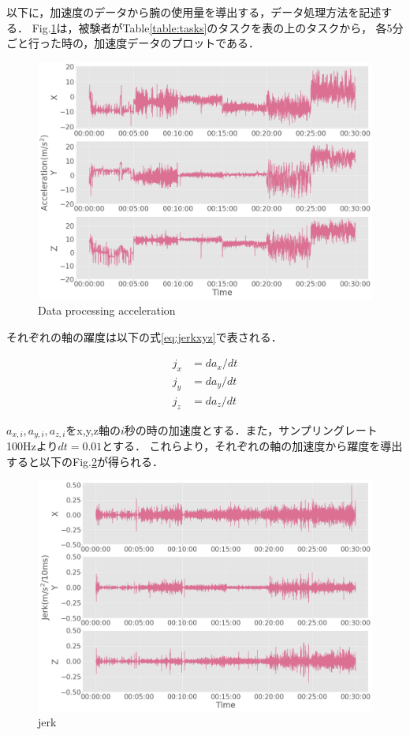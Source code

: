 以下に，加速度のデータから腕の使用量を導出する，データ処理方法を記述する．
Fig.\ref{fig:accel_xyz}は，被験者がTable\ref{table:tasks}のタスクを表の上のタスクから，
各5分ごと行った時の，加速度データのプロットである．

\begin{figure}[H]
  \centering
  \includegraphics[width=0.8\linewidth]{fig/accel_xyz}
  \caption{Data processing acceleration}
  \label{fig:accel_xyz}
\end{figure}


それぞれの軸の躍度は以下の式\ref{eq:jerkxyz}で表される．

\begin{eqnarray}
j_x & = da_x/dt\\
j_y & = da_y/dt\\
j_z & = da_z/dt
\label{eq:jerkxyz}
\end{eqnarray}

$a_{x,i}, a_{y,i},a_{z,i}$をx,y,z軸の$i$秒の時の加速度とする．また，サンプリングレート100Hzより$dt=0.01$とする．
これらより，それぞれの軸の加速度から躍度を導出すると以下のFig.\ref{fig:jerk_xyz}が得られる．

\begin{figure}[H]
  \centering
  \includegraphics[width=0.8\linewidth]{fig/jerk_xyz}
  \caption{jerk}
  \label{fig:jerk_xyz}
\end{figure}

